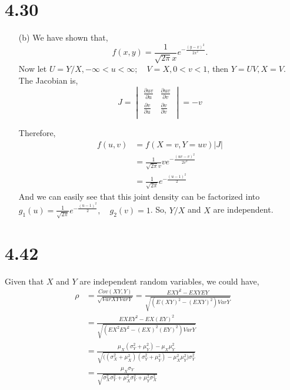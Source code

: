 \documentclass[letterpaper]{article}
\begin{document}
    \section*{4.30}
    \begin{enumerate}
    \item[(b)] We have shown that,
    \[
    f(x, y) = \frac{1}{\sqrt{2\pi} x} e^{-\frac{(y-x)^2}{2x^2}}.
    \]
    Now let $U=Y/X, -\infty < u < \infty; \quad V=X, 0 < v < 1$, then $Y = UV, X = V$. The Jacobian is,
    \[
    J = \begin{vmatrix}
    \frac{\partial uv}{\partial u} & \frac{\partial uv}{\partial v} \\
    \frac{\partial v}{\partial u} & \frac{\partial v}{\partial v} \\
    \end{vmatrix} = -v
    \]

    Therefore,
    \begin{align*}
    f(u,v) & = f(X=v, Y=uv)|J| \\
    & = \frac{1}{\sqrt{2\pi}v} v e^{-\frac{(uv-v)^2}{2v^2}} \\
    & = \frac{1}{\sqrt{2\pi}} e^{-\frac{(u-1)^2}{2}}
    \end{align*}
    And we can easily see that this joint density can be factorized into $g_1(u) = \frac{1}{\sqrt{2\pi}} e^{-\frac{(u-1)^2}{2}}, \quad g_2(v) = 1$. So, $Y/X$ and $X$ are independent.
    \end{enumerate}

    \section*{4.42}
    Given that $X$ and $Y$ are independent random variables, we could have,
    \begin{align*}
    \rho & = \frac{Cov(XY, Y)}{\sqrt{Var XY Var Y}} = \frac{EXY^2 - EXYEY}{\sqrt{(E(XY)^2 - (EXY)^2)Var Y}} \\
    & = \frac{EXEY^2 - EX(EY)^2}{\sqrt{(EX^2EY^2 - (EX)^2(EY)^2)Var Y}} \\
    & = \frac{\mu_X (\sigma_Y^2 + \mu_Y^2) - \mu_X \mu_Y^2}{\sqrt{\big((\sigma^2_X + \mu_X^2)(\sigma^2_Y + \mu_Y^2)-\mu_X^2\mu_Y^2\big)\sigma^2_Y}} \\
    & = \frac{\mu_X\sigma_Y}{\sqrt{\sigma^2_X\sigma^2_Y + \mu_X^2\sigma^2_Y + \mu_Y^2\sigma^2_X}}
    \end{align*}
\end{document}
